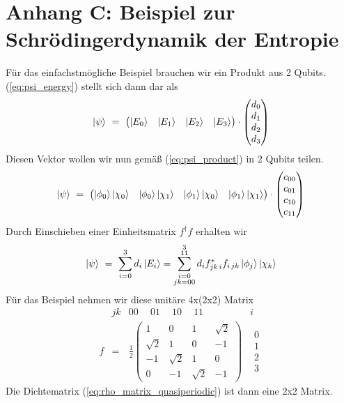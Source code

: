 \documentclass[12pt]{article}
\begin{document}
\section{Anhang C: Beispiel zur Schrödingerdynamik der Entropie}
Für das einfachstmögliche Beispiel brauchen wir ein Produkt aus 2 Qubits. (\ref{eq:psi_energy}) stellt sich dann dar als 
\begin{equation*}
\ket{\psi}\ =\ \begin{pmatrix}
\ket{E_0} & \ket{E_1} & \ket{E_2} & \ket{E_3}
\end{pmatrix}
\cdot
\begin{pmatrix}
d_0 \\ d_1 \\ d_2 \\ d_3 
\end{pmatrix}
\end{equation*}
Diesen Vektor wollen wir nun gemäß (\ref{eq:psi_product}) in 2 Qubits teilen.
\begin{equation*}
\ket{\psi}\ =\ \begin{pmatrix}
\ket{\phi_0}\ket{\chi_0} & \ket{\phi_0}\ket{\chi_1} & \ket{\phi_1}\ket{\chi_0} & \ket{\phi_1}\ket{\chi_1}
\end{pmatrix}
\cdot
\begin{pmatrix}
c_{00} \\ c_{01} \\ c_{10} \\ c_{11}
\end{pmatrix}
\end{equation*}
Durch Einschieben einer Einheitsmatrix $ f^\dagger f$ erhalten wir
\begin{equation*}
\ket{\psi}\ =\ \sum_{i=0}^{3} d_i \ket{E_i} = \sum_{\substack{i=0\\jk=00}}^{\substack{3\\11}} d_i f_{jk\,i}^* f_{i\,jk} \ket{\phi_j}\ket{\chi_k}
\end{equation*}
Für das Beispiel nehmen wir diese unitäre 4x(2x2) Matrix
\begin{equation*}
\begin{matrix}
 & jk & 00\quad \ 01\quad \ 10\quad \ 11 & i \\
f & = & \frac{1}{2}
\begin{pmatrix}
\label{eq:f}
1 & 0 & 1 & \sqrt{2} \\
\sqrt{2} & 1 & 0 & -1 \\
-1 & \sqrt{2} & 1 & 0 \\
0 & -1 & \sqrt{2} & -1
\end{pmatrix} 
& \begin{matrix}0\\1\\2\\3\end{matrix}
\end{matrix}
\end{equation*}
Die Dichtematrix (\ref{eq:rho_matrix_quasiperiodic}) ist dann eine 2x2 Matrix.
\end{document}
